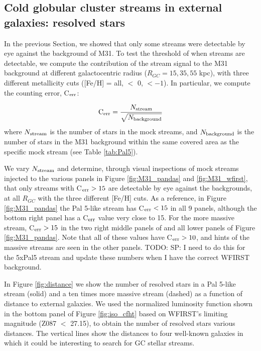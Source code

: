 \documentclass[twocolumn]{aastex62}
\newcommand{\todo}[1]{{\color{red} TODO: #1}}
\begin{document}
\subsection{Cold globular cluster streams in external galaxies: resolved stars}
\label{sec:resother}
In the previous Section, we showed that only some streams were detectable by eye against the background of M31. To test the threshold of when streams are detectable, we compute the contribution of the stream signal to the M31 background at different galactocentric radius ($R_{GC} = 15, 35, 55$ kpc), with three different metallicity cuts ([Fe/H] = all, $<$ 0, $< -1$).  In particular, we compute the counting error, C$_{\rm err}$: 

\begin{equation}
{\rm C}_{\rm err} = \frac{N_{\rm stream}}{\sqrt{N_{\rm background}}}
\end{equation}
where $N_{\rm stream}$ is the number of stars in the mock streams, and $N_{\rm background}$ is the number of stars in the M31 background within the same covered area as the specific mock stream (see Table \ref{tab:Pal5}). 

We vary $N_{\rm stream}$ and determine, through visual inspections of mock streams injected to the various panels in Figure \ref{fig:M31_pandas} and \ref{fig:M31_wfirst}, that only streams with C$_{\rm err} > 15$ are detectable by eye against the backgrounds, at all $R_{GC}$ with the three different [Fe/H] cuts. As a reference, in Figure \ref{fig:M31_pandas} the Pal 5-like stream has C$_{\rm err} < 15$ in all 9 panels, although the bottom right panel has a  C$_{\rm err}$ value very close to 15. For the more massive stream, C$_{\rm err} > 15$ in the two right middle panels of and all lower panels of Figure \ref{fig:M31_pandas}. Note that all of these values have  C$_{\rm err} > 10$, and hints of the massive streams are seen in the other panels. \todo{SP: I need to do this for the 5xPal5 stream and update these numbers when I have the correct WFIRST background. }

In Figure \ref{fig:distance} we show the number of resolved stars in a Pal 5-like stream (solid) and a ten times more massive stream (dashed) as a function of distance to external galaxies. We used the normalized luminosity function shown in the bottom panel of Figure \ref{fig:iso_cfht} based on WFIRST's limiting magnitude (Z087 $<$ 27.15), to obtain the number of resolved stars various distances. The vertical lines show the distances to four well-known galaxies in which it could be interesting to search for GC stellar streams. 
\end{document}
